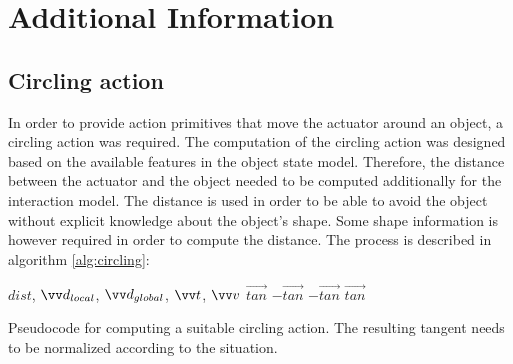 \chapter{Additional Information}

\section{Circling action \label{sec:circling}}

In order to provide action primitives that move the actuator around an object, a circling action was required. The computation of the circling action was designed based on the available features in the object state model.
Therefore, the distance between the actuator and the object needed to be computed additionally for the interaction model. The distance is used in order to be able to avoid the object without explicit knowledge about the object's shape. Some shape information is however required in order to compute the distance. 
The process is described in algorithm \ref{alg:circling}:

\begin{algorithm}
\begin{algorithmic}[1]
\Statex
{} {$dist$, $\protect\vec{d}_{local}$, $\protect\vec{d}_{global}$, $\protect\vec{t}$, $\protect\vec{v}$}
	\Else 
	\EndIf
	\State {}
\EndFunction
\Statex
{}
			\State \Return $\vec{tan}$
		\Else
			\State \Return $-\vec{tan}$
		\EndIf
	\Else
			\State \Return $-\vec{tan}$
		\Else
			\State \Return $\vec{tan}$
		\EndIf
	\EndIf
\EndFunction
\end{algorithmic}
\caption{Pseudocode for computing a suitable circling action. The resulting tangent needs to be normalized according to the situation.}
\label{alg:circling}
\end{algorithm}


